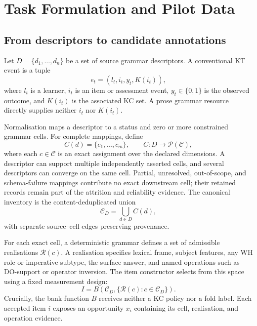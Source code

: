 \section{Task Formulation and Pilot Data}
\label{sec:task-data}

\subsection{From descriptors to candidate annotations}

Let $D=\{d_1,\ldots,d_n\}$ be a set of source grammar descriptors.  A
conventional KT event is a tuple
\begin{equation}
  e_t=(l_t,i_t,y_t,K(i_t)),
\end{equation}
where $l_t$ is a learner, $i_t$ is an item or assessment event,
$y_t\in\{0,1\}$ is the observed outcome, and $K(i_t)$ is the associated KC
set.  A prose grammar resource directly supplies neither $i_t$ nor $K(i_t)$.

Normalisation maps a descriptor to a status and zero or more constrained
grammar cells.  For complete mappings, define
\begin{equation}
 C(d)=\{c_1,\ldots,c_m\}, \qquad
 C:D\rightarrow\mathcal{P}(\mathcal{C}),
\end{equation}
where each $c\in\mathcal{C}$ is an exact assignment over the declared
dimensions.  A descriptor can support multiple independently asserted cells,
and several descriptors can converge on the same cell.  Partial, unresolved,
out-of-scope, and schema-failure mappings contribute no exact downstream cell;
their retained records remain part of the attrition and reliability evidence.
The canonical inventory is the content-deduplicated union
\begin{equation}
 \mathcal{C}_D=\bigcup_{d\in D}C(d),
\end{equation}
with separate source--cell edges preserving provenance.

For each exact cell, a deterministic grammar defines a set of admissible
realisations $\mathcal{R}(c)$.  A realisation specifies lexical frame, subject
features, any WH role or imperative subtype, the surface answer, and named
operations such as DO-support or operator inversion.  The item constructor
selects from this space using a fixed measurement design:
\begin{equation}
 I=B\!\left(\mathcal{C}_D,\{\mathcal{R}(c):c\in\mathcal{C}_D\}\right).
\end{equation}
Crucially, the bank function $B$ receives neither a KC policy nor a fold label.
Each accepted item $i$ exposes an opportunity $x_i$ containing its cell,
realisation, and operation evidence.

